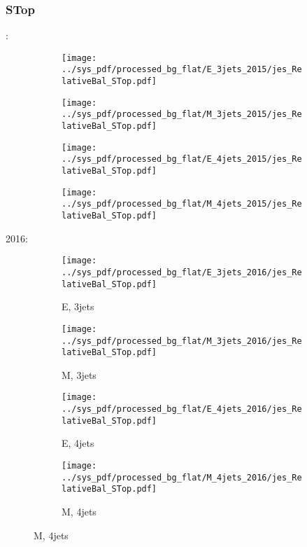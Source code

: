 \documentclass{beamer}
\begin{document}
\begin{frame}
\frametitle{STop}
\fontsize{5}{1}:
\begin{figure}
\centering
\begin{subfigure}[b]{0.24\textwidth}
\texttt{[image: ../sys\_pdf/processed\_bg\_flat/E\_3jets\_2015/jes\_RelativeBal\_STop.pdf]}
\end{subfigure}
\begin{subfigure}[b]{0.24\textwidth}
\texttt{[image: ../sys\_pdf/processed\_bg\_flat/M\_3jets\_2015/jes\_RelativeBal\_STop.pdf]}
\end{subfigure}
\begin{subfigure}[b]{0.24\textwidth}
\texttt{[image: ../sys\_pdf/processed\_bg\_flat/E\_4jets\_2015/jes\_RelativeBal\_STop.pdf]}
\end{subfigure}
\begin{subfigure}[b]{0.24\textwidth}
\texttt{[image: ../sys\_pdf/processed\_bg\_flat/M\_4jets\_2015/jes\_RelativeBal\_STop.pdf]}
\end{subfigure}
\end{figure}
2016:
\begin{figure}
\centering
\begin{subfigure}[b]{0.24\textwidth}
\texttt{[image: ../sys\_pdf/processed\_bg\_flat/E\_3jets\_2016/jes\_RelativeBal\_STop.pdf]}
\captionsetup{font=tiny}
\caption{E, 3jets}
\end{subfigure}
\begin{subfigure}[b]{0.24\textwidth}
\texttt{[image: ../sys\_pdf/processed\_bg\_flat/M\_3jets\_2016/jes\_RelativeBal\_STop.pdf]}
\captionsetup{font=tiny}
\caption{M, 3jets}
\end{subfigure}
\begin{subfigure}[b]{0.24\textwidth}
\texttt{[image: ../sys\_pdf/processed\_bg\_flat/E\_4jets\_2016/jes\_RelativeBal\_STop.pdf]}
\captionsetup{font=tiny}
\caption{E, 4jets}
\end{subfigure}
\begin{subfigure}[b]{0.24\textwidth}
\texttt{[image: ../sys\_pdf/processed\_bg\_flat/M\_4jets\_2016/jes\_RelativeBal\_STop.pdf]}
\captionsetup{font=tiny}
\caption{M, 4jets}
\end{subfigure}
\end{figure}
\end{frame}
\end{document}
